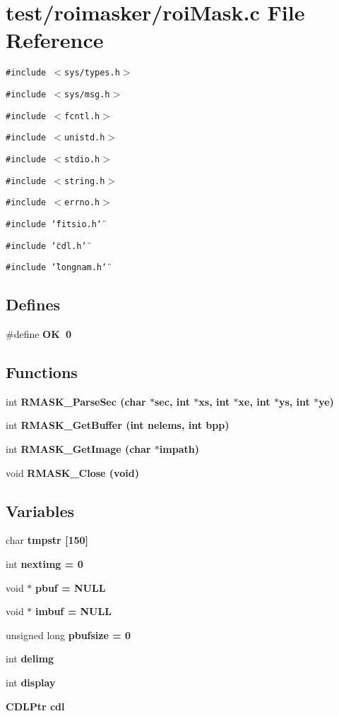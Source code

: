 \section{test/roimasker/roi\-Mask.c File Reference}
\label{roiMask_8c}
{\tt \#include $<$sys/types.h$>$}\par
{\tt \#include $<$sys/msg.h$>$}\par
{\tt \#include $<$fcntl.h$>$}\par
{\tt \#include $<$unistd.h$>$}\par
{\tt \#include $<$stdio.h$>$}\par
{\tt \#include $<$string.h$>$}\par
{\tt \#include $<$errno.h$>$}\par
{\tt \#include \char`\"{}fitsio.h\char`\"{}}\par
{\tt \#include \char`\"{}cdl.h\char`\"{}}\par
{\tt \#include \char`\"{}longnam.h\char`\"{}}\par
\subsection*{Defines}
\begin{CompactItemize}
\item 
\#define \bf{OK}~0
\end{CompactItemize}
\subsection*{Functions}
\begin{CompactItemize}
\item 
int \bf{RMASK\_\-Parse\-Sec} (char $\ast$sec, int $\ast$xs, int $\ast$xe, int $\ast$ys, int $\ast$ye)
\item 
int \bf{RMASK\_\-Get\-Buffer} (int nelems, int bpp)
\item 
int \bf{RMASK\_\-Get\-Image} (char $\ast$impath)
\item 
void \bf{RMASK\_\-Close} (void)
\end{CompactItemize}
\subsection*{Variables}
\begin{CompactItemize}
\item 
char \bf{tmpstr} [150]
\item 
int \bf{nextimg} = 0
\item 
void $\ast$ \bf{pbuf} = NULL
\item 
void $\ast$ \bf{imbuf} = NULL
\item 
unsigned long \bf{pbufsize} = 0
\item 
int \bf{delimg}
\item 
int \bf{display}
\item 
\bf{CDLPtr} \bf{cdl}
\end{CompactItemize}


